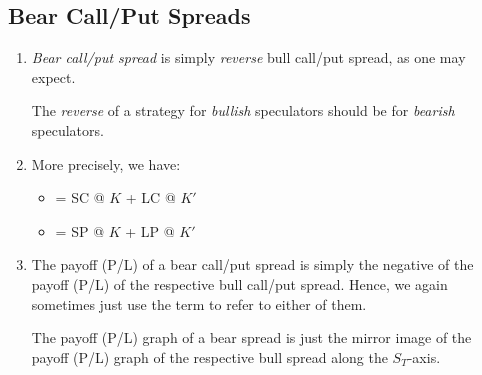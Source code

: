 \subsection{Bear Call/Put Spreads}
\begin{enumerate}
\item \emph{Bear call/put spread} is simply \emph{reverse} bull call/put
spread, as one may expect.

\begin{intuition}
The \emph{reverse} of a strategy for \emph{bullish} speculators should be for
\emph{bearish} speculators.
\end{intuition}

\item More precisely, we have:
\begin{itemize}
\item {} = SC @ \(K\) + LC @ \(K'\)
\item {} = SP @ \(K\) + LP @ \(K'\)
\end{itemize}

\item The payoff (P/L) of a bear call/put spread is simply the negative of the
payoff (P/L) of the respective bull call/put spread. Hence, we again sometimes
just use the term  to refer to either of them.
\begin{note}
The payoff (P/L) graph of a bear spread is just the mirror image of the payoff
(P/L) graph of the respective bull spread along the \(S_T\)-axis.
\end{note}
\end{enumerate}
